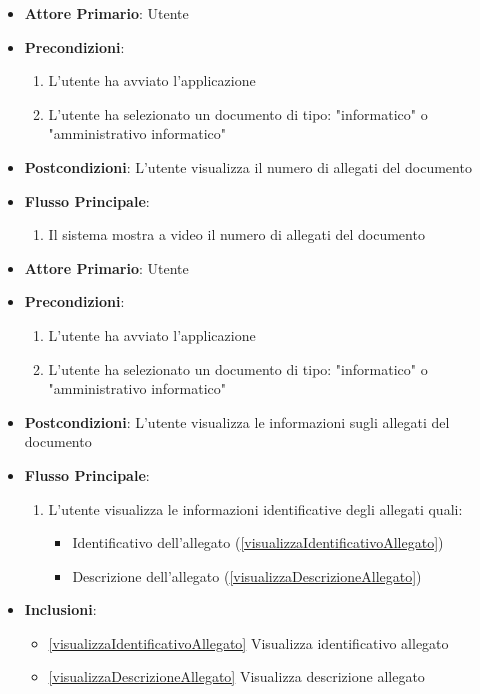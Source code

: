 \begin{itemize}
    \item \textbf{Attore Primario}: Utente
    \item \textbf{Precondizioni}:
    \begin{enumerate}
        \item L'utente ha avviato l'applicazione
        \item L'utente ha selezionato un documento di tipo: "informatico" o "amministrativo informatico"
    \end{enumerate}
    \item \textbf{Postcondizioni}: L'utente visualizza il numero di allegati del documento
    \item \textbf{Flusso Principale}:
        \begin{enumerate}
         \item Il sistema mostra a video il numero di allegati del documento
    \end{enumerate}
\end{itemize}

\begin{itemize}
    \item \textbf{Attore Primario}: Utente
    \item \textbf{Precondizioni}:
    \begin{enumerate}
        \item L'utente ha avviato l'applicazione
        \item L'utente ha selezionato un documento di tipo: "informatico" o "amministrativo informatico"
    \end{enumerate}
    \item \textbf{Postcondizioni}: L'utente visualizza le informazioni sugli allegati del documento
    \item \textbf{Flusso Principale}: 
    \begin{enumerate}
        \item L'utente visualizza le informazioni identificative degli allegati quali:
        \begin{itemize}
            \item Identificativo dell'allegato (\ref{visualizzaIdentificativoAllegato})
            \item Descrizione dell'allegato (\ref{visualizzaDescrizioneAllegato})
        \end{itemize}    
    \end{enumerate}
    \item \textbf{Inclusioni}:
    \begin{itemize}
        \item \ref{visualizzaIdentificativoAllegato} Visualizza identificativo allegato
        \item \ref{visualizzaDescrizioneAllegato} Visualizza descrizione allegato
    \end{itemize}
\end{itemize}

